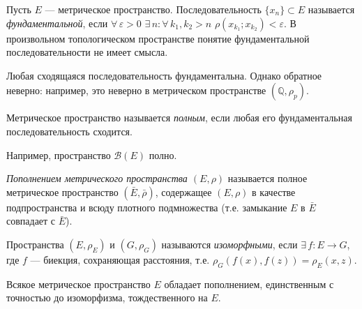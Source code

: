 \documentclass[12pt,titlepage, a4paper]{article}
\begin{document}
\begin{defen}
Пусть $E$ --- метрическое пространство. Последовательность
$\{x_n\}\subset E$ называется \emph{фундаментальной}, если
$\forall\,\varepsilon>0$ $\exists\,n:\forall\,k_1,k_2>n$
$\rho(x_{k_1};x_{k_2})<\varepsilon$. В произвольном топологическом
пространстве понятие фундаментальной последовательности не имеет
смысла.
\end{defen}

\begin{zam}
Любая сходящаяся последовательность фундаментальна. Однако обратное
неверно: например, это неверно в метрическом пространстве
$(\mathbb{Q},\rho_p)$.
\end{zam}

\begin{defen}
Метрическое пространство называется \emph{полным}, если любая его
фундаментальная последовательность сходится.

Например, пространство $\mathcal{B}(E)$ полно.
\end{defen}

\begin{defen}
\emph{Пополнением метрического пространства $(E,\rho)$} называется
полное метрическое пространство $(\bar{E},\bar{\rho})$, содержащее
$(E,\rho)$ в качестве подпространства и всюду плотного подмножества
(т.е. замыкание $E$ в $\bar{E}$ совпадает с $\bar{E}$).
\end{defen}

\begin{defen}
Пространства $(E,\rho_E)$ и $(G,\rho_G)$ называются
\emph{изоморфными}, если $\exists\,f\colon E\to G$, где $f$ ---
биекция, сохраняющая расстояния, т.е.
$\rho_G(f(x),f(z))=\rho_E(x,z)$.
\end{defen}

\lecture

\begin{theorem}
Всякое метрическое пространство $E$ обладает пополнением,
единственным с точностью до изоморфизма, тождественного на $E$.
\end{theorem}
\end{document}
